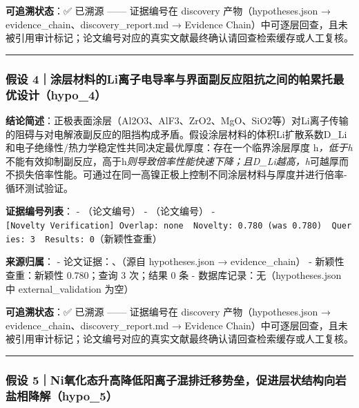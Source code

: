 \documentclass[12pt,a4paper]{ctexart}
\begin{document}
\textbf{可追溯状态}：✅ 已溯源 ------ 证据编号在 discovery 产物（hypotheses.json → evidence\_chain、discovery\_report.md → Evidence Chain）中可逐层回查，且未被引用审计标记；论文编号对应的真实文献最终确认请回查检索缓存或人工复核。

\begin{center}\rule{0.5\linewidth}{0.5pt}\end{center}

\subsubsection{假设 4｜涂层材料的Li离子电导率与界面副反应阻抗之间的帕累托最优设计（hypo\_4）}\label{ux5047ux8bbe-4ux6d82ux5c42ux6750ux6599ux7684liux79bbux5b50ux7535ux5bfcux7387ux4e0eux754cux9762ux526fux53cdux5e94ux963bux6297ux4e4bux95f4ux7684ux5e15ux7d2fux6258ux6700ux4f18ux8bbeux8ba1hypo_4}

\textbf{结论简述}：正极表面涂层（Al2O3、AlF3、ZrO2、MgO、SiO2等）对Li离子传输的阻碍与对电解液副反应的阻挡构成矛盾。假设涂层材料的体积Li扩散系数D\_Li和电子绝缘性/热力学稳定性共同决定最优厚度：存在一个临界涂层厚度 h\emph{，低于h}不能有效抑制副反应，高于h\emph{则导致倍率性能快速下降；且D\_Li越高，h}可越厚而不损失倍率性能。可通过在同一高镍正极上控制不同涂层材料与厚度并进行倍率-循环测试验证。

\textbf{证据编号列表}： - \texttt{\cite{p39}}（论文编号） - \texttt{\cite{p42}}（论文编号） - \texttt{{[}Novelty\ Verification{]}\ Overlap:\ none\ \textbar{}\ Novelty:\ 0.780\ (was\ 0.780)\ \textbar{}\ Queries:\ 3\ \textbar{}\ Results:\ 0}（新颖性查重）

\textbf{来源归属}： - 论文证据：\texttt{\cite{p39}}、\texttt{\cite{p42}}（源自 hypotheses.json → evidence\_chain） - 新颖性查重：新颖性 0.780；查询 3 次；结果 0 条 - 数据库记录：无（hypotheses.json 中 external\_validation 为空）

\textbf{可追溯状态}：✅ 已溯源 ------ 证据编号在 discovery 产物（hypotheses.json → evidence\_chain、discovery\_report.md → Evidence Chain）中可逐层回查，且未被引用审计标记；论文编号对应的真实文献最终确认请回查检索缓存或人工复核。

\begin{center}\rule{0.5\linewidth}{0.5pt}\end{center}

\subsubsection{假设 5｜Ni氧化态升高降低阳离子混排迁移势垒，促进层状结构向岩盐相降解（hypo\_5）}\label{ux5047ux8bbe-5niux6c27ux5316ux6001ux5347ux9ad8ux964dux4f4eux9633ux79bbux5b50ux6df7ux6392ux8fc1ux79fbux52bfux5792ux4fc3ux8fdbux5c42ux72b6ux7ed3ux6784ux5411ux5ca9ux76d0ux76f8ux964dux89e3hypo_5}
\end{document}
